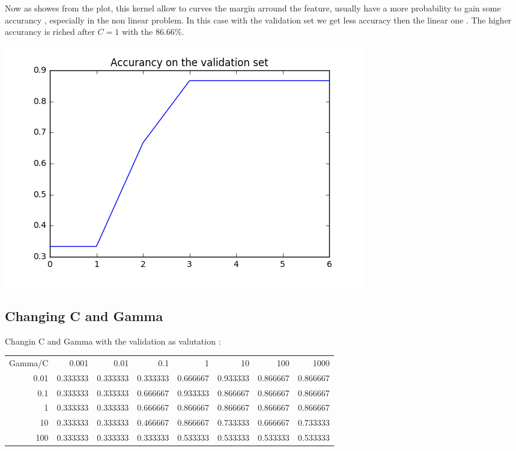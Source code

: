 \documentclass[11pt]{article}
\theoremstyle{plain}
\begin{document}
Now as showes from the plot, this kernel allow to curves the margin arround the feature, usually have a more probability to gain some accurancy , especially in the non linear problem. In this case with the validation set we get less accuracy then the linear one . The higher accurancy is riched after $ C = 1 $ with the $86.66$\%.

\begin{center}
\includegraphics[scale=0.5]{4}
\end{center}

\subsection*{Changing C and Gamma}
Changin C and Gamma with the validation as valutation  : 
\begin{center}
\begin{tabular}{|| r | r | r | r | r | r | r | r ||}
\hline
   Gamma/C    & 0.001    & 0.01     & 0.1      & 1        & 10        & 100        & 1000        \\
   0.01 & 0.333333 & 0.333333 & 0.333333 & 0.666667 &  0.933333 &   0.866667 &    0.866667 \\
   0.1  & 0.333333 & 0.333333 & 0.666667 & 0.933333 &  0.866667 &   0.866667 &    0.866667 \\
   1    & 0.333333 & 0.333333 & 0.666667 & 0.866667 &  0.866667 &   0.866667 &    0.866667 \\
  10    & 0.333333 & 0.333333 & 0.466667 & 0.866667 &  0.733333 &   0.666667 &    0.733333 \\
 100    & 0.333333 & 0.333333 & 0.333333 & 0.533333 &  0.533333 &   0.533333 &    0.533333 \\
\hline
\end{tabular}
\end{center}
\end{document}
